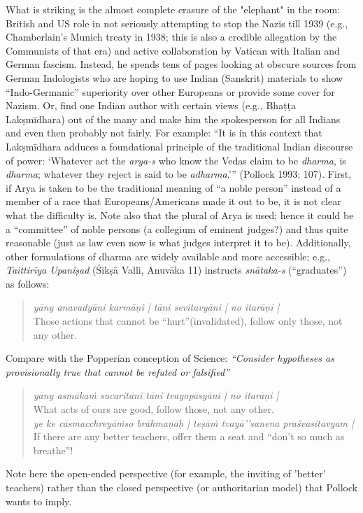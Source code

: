 {\begin{enumerate}
What is striking is the almost complete erasure of the "elephant" in the room: British and US role in not seriously attempting to stop the Nazis till 1939 (e.g., Chamberlain’s Munich treaty in 1938; this is also a credible allegation by the Communists of that era) and active collaboration by Vatican with Italian and German fascism. Instead, he spends tens of pages looking at obscure sources from German Indologists who are hoping to use Indian (Sanskrit) materials to show “Indo-Germanic” superiority over other Europeans or provide some cover for Nazism. Or, find one Indian author with certain views (e.g., Bhaṭṭa Lakṣmīdhara) out of the many and make him the spokesperson for all Indians and even then probably not fairly. For example: “It is in this context that Lakṣmīdhara adduces a foundational principle of the traditional Indian discourse of power: ‘Whatever act the {\sl arya-s} who know the Vedas claim to be {\sl dharma}, is {\sl dharma}; whatever they reject is said to be {\sl adharma}.’” (Pollock 1993: 107). First, if Arya is taken to be the traditional meaning of “a noble person” instead of a member of a race that Europeans/Americans made it out to be, it is not clear what the difficulty is. Note also that the plural of Arya is used; hence it could be a “committee” of noble persons (a collegium of eminent judges?) and thus quite reasonable (just as law even now is what judges interpret it to be). Additionally, other formulations of dharma are widely available and more accessible; e.g., {\sl Taittirīya Upaniṣad} (Śikṣā Valli, Anuvāka 11) instructs {\sl snātaka-s} (“graduates”) as follows:
\begin{quote}
{\sl yāny anavadyāni karmāṇi | tāni sevitavyāni | no itarāṇi |}\\
{\rm Those actions that cannot be “hurt”(invalidated), follow only those, not any other.}
\end{quote}
Compare with the Popperian conception of Science: {\sl “Consider hypotheses as provisionally true that cannot be refuted or falsified”}
\begin{quote}
{\sl yāny asmākaṁ sucaritāni tāni tvayopāsyāni | no itarāṇi |}\\
What acts of ours are good, follow those, not any other.\\[2pt]
{\sl ye ke cāsmacchreyāṁso brāhmaṇāḥ | teṣāṁ tvayā’’sanena praśvasitavyam |}\\
If there are any better teachers, offer them a seat and “don't so much as breathe”!
\end{quote}
Note here the open-ended perspective (for example, the inviting of 'better' teachers) rather than the closed perspective (or authoritarian model) that Pollock wants to imply.
\end{enumerate}}

